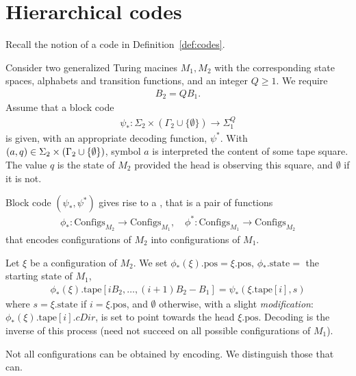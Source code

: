 \documentclass[12pt]{memoir}
\newcommand{\fld}[1]{\ensuremath{\textit{#1}}}
\renewcommand{\B}{B}
\newcommand{\Configs}{\mathrm{Configs}}
\newcommand{\pos}{\mathrm{pos}}
\newcommand{\cDir}{\fld{cDir}}
\newcommand{\state}{\mathrm{state}}
\newcommand{\tape}{\mathrm{tape}}
\begin{document}
\section{Hierarchical codes}\label{sec:hier-codes}

Recall the notion of a code in Definition~\ref{def:codes}.

\begin{definition}\label{def:configuration-code}
Consider two generalized Turing macines \( M_{1},M_{2} \) with the corresponding
state spaces, alphabets and transition functions, and an integer \( Q\ge 1 \).
We require
\begin{align}\label{eq:B_2-B_1-Q}
  \B_{2} = Q \B_{1}.
\end{align}
Assume that a block code
\begin{align*}
   \psi_{*}:\Sigma_{2}\times(\Gamma_{2}\cup\{\emptyset\})\to\Sigma_{1}^{Q}
 \end{align*}
is given, with an appropriate decoding function, $\psi^{*}$.
With \( (a,q)\in\Sigma_{2}\times(\Gamma_{2}\cup\{\emptyset\}) \),
symbol \( a \) is interpreted the content of some tape square.
The value \( q \) is the state of \( M_{2} \) provided the head is observing this square,
and \( \emptyset \) if it is not.

Block code $(\psi_{*},\psi^{*})$ gives rise to a 
, that is a pair of functions
    \begin{align*}
        \phi_{*} :\Configs_{M_2} \to \Configs_{M_1},
        \quad
        \phi^{*}:\Configs_{M_1} \to \Configs_{M_2}
    \end{align*}
    that encodes configurations of $M_2$ into configurations of $M_{1}$.

Let $\xi$ be a configuration of $M_2$.
We set $\phi_*(\xi).\pos = \xi.\pos$, \(\phi_{*}.\state=  \) 
the starting state of \( M_{1} \),
\begin{align*}
 \phi_*(\xi).\tape[i\B_2, \dots, (i+1)\B_2 - \B_1] = \psi_*(\xi.\tape[i], s)
 \end{align*}
where \( s=\xi.\state \) if $i = \xi.\pos$, and $\emptyset$ otherwise, with
a slight \emph{modification}: 
$\phi_*(\xi).\tape[i].\cDir$, is set to point towards the head \( \xi.\pos \).
Decoding is the inverse of this process (need not succeed on all possible configurations
of \( M_{1} \)).
 \end{definition}

 Not all configurations can be obtained by encoding.
 We distinguish those that can.
\end{document}
